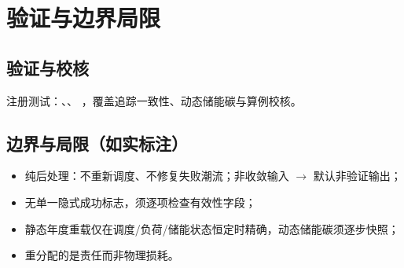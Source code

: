 \documentclass[UTF8,fontset=fandol,a4paper,11pt]{ctexart}
\begin{document}
\section{验证与边界局限}
\subsection{验证与校核}
注册测试：、、
，覆盖追踪一致性、动态储能碳与算例校核。

\subsection{边界与局限（如实标注）}
\begin{itemize}
  \item 纯后处理：不重新调度、不修复失败潮流；非收敛输入 $\to$ 默认非验证输出；
  \item 无单一隐式成功标志，须逐项检查有效性字段；
  \item 静态年度重载仅在调度/负荷/储能状态恒定时精确，动态储能碳须逐步快照；
  \item {} 重分配的是责任而非物理损耗。
\end{itemize}

\end{document}
